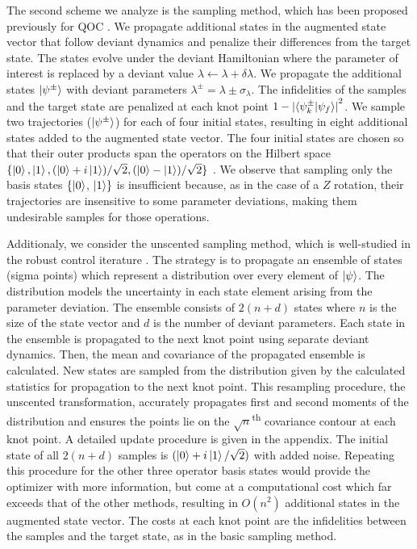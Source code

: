 \documentclass[
  amsfonts,
  amsmath,
  tbtags,
  amssymb,
  aps,
  nobibnotes,
  twocolumn,
  superscriptaddress,
]{revtex4-2}
\begin{document}
The second scheme we analyze is the sampling method,
which has been proposed previously for
QOC \cite{reinhold2019controlling}.
We propagate additional states in the augmented state vector that follow deviant dynamics
and penalize their differences from the target state.
The states evolve under the deviant
Hamiltonian where the parameter of interest is replaced by
a deviant value $\lambda \gets \lambda + \delta \lambda$.
We propagate the additional states $\ket{\psi^{\pm}}$ with
deviant parameters $\lambda^{\pm} = \lambda \pm \sigma_{\lambda}$.
The infidelities of the samples and the target
state are penalized at each knot point
$1 - {\lvert \braket{\psi^{\pm}_{k} | \psi_{f}} \rvert}^{2}$.
We sample two trajectories ($\ket{\psi^{\pm}}$) for each of four initial states,
resulting in eight additional states added to the augmented state vector.
The four initial states are chosen so
that their outer products span the operators on the
Hilbert space $\{\ket{0}, \ket{1}, (\ket{0} + i\ket{1}) / \sqrt{2},
  (\ket{0} - \ket{1}) / \sqrt{2}\}$ \cite{chow2009randomized}. We observe
that sampling only the basis states $\{\ket{0}$, $\ket{1}\}$
is insufficient because, as in the case of a $Z$ rotation, their
trajectories are insensitive to some parameter deviations, making
them undesirable samples for those operations.

Additionaly, we consider the unscented sampling method,
which is well-studied in the robust control iterature
\cite{julier2004unscented, lee2013sigma, manchester2016derivative}.
The strategy is to
propagate an ensemble of states (sigma points) which represent a distribution
over every element of $\ket{\psi}$. The distribution
models the uncertainty in each state element arising from the
parameter deviation. The ensemble consists of $2 (n + d)$ states
where $n$ is the size of the state vector and $d$ is the number of
deviant parameters. Each state in the ensemble is propagated to the next
knot point using separate deviant dynamics. Then, the mean and covariance of
the propagated ensemble is calculated. New states are sampled from the distribution
given by the calculated statistics for propagation to the next knot point.
This resampling procedure, the unscented transformation, accurately propagates
first and second moments of the distribution and ensures the points
lie on the $\sqrt{n}$\textsuperscript{th}
covariance contour at each knot point. A detailed update procedure is given
in the appendix. The initial state of all $2 (n + d)$ samples is
$(\ket{0} + i\ket{1} / \sqrt{2})$ with added noise. Repeating this procedure for the other
three operator basis states would provide the optimizer with more information,
but come at a computational cost which far exceeds that of the other methods,
resulting in $O(n^2)$ additional states in the augmented state vector. The
costs at each knot point are the infidelities
between the samples and the target state, as in the
basic sampling method.
\end{document}
